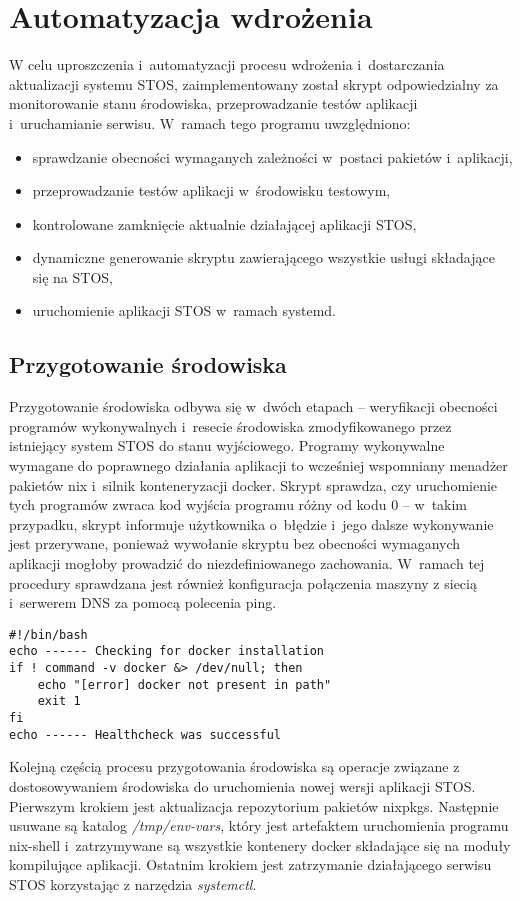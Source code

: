 
\section{Automatyzacja wdrożenia}
W celu uproszczenia i~automatyzacji procesu wdrożenia i~dostarczania aktualizacji systemu STOS, zaimplementowany został skrypt odpowiedzialny za monitorowanie stanu środowiska, przeprowadzanie testów aplikacji i~uruchamianie serwisu. W~ramach tego programu uwzględniono:
\begin{itemize}
	\item sprawdzanie obecności wymaganych zależności w~postaci pakietów i~aplikacji,
	\item przeprowadzanie testów aplikacji w~środowisku testowym,
	\item kontrolowane zamknięcie aktualnie działającej aplikacji STOS,
	\item dynamiczne generowanie skryptu zawierającego wszystkie usługi składające się na STOS,
	\item uruchomienie aplikacji STOS w~ramach systemd.
\end{itemize}
\subsection{Przygotowanie środowiska}
Przygotowanie środowiska odbywa się w~dwóch etapach -- weryfikacji obecności programów wykonywalnych i~resecie środowiska zmodyfikowanego przez istniejący system STOS do stanu wyjściowego. 
\newline \noindent Programy wykonywalne wymagane do poprawnego działania aplikacji to wcześniej wspomniany menadżer pakietów nix i~silnik konteneryzacji docker. Skrypt sprawdza, czy uruchomienie tych programów zwraca kod wyjścia programu różny od kodu 0 -- w~takim przypadku, skrypt informuje użytkownika o~błędzie i~jego dalsze wykonywanie jest przerywane, ponieważ wywołanie skryptu bez obecności wymaganych aplikacji mogłoby prowadzić do niezdefiniowanego zachowania. W~ramach tej procedury sprawdzana jest również konfiguracja połączenia maszyny z siecią i~serwerem DNS za pomocą polecenia ping.
\lstset{style=shell}
\begin{lstlisting}[caption = {Przykład weryfikacji obecności instalacji programu "docker" w~systemie.}]
#!/bin/bash
echo ------ Checking for docker installation 
if ! command -v docker &> /dev/null; then
    echo "[error] docker not present in path"
    exit 1
fi
echo ------ Healthcheck was successful 
\end{lstlisting}
\noindent Kolejną częścią procesu przygotowania środowiska są operacje związane z dostosowywaniem środowiska do uruchomienia nowej wersji aplikacji STOS. Pierwszym krokiem jest aktualizacja repozytorium pakietów nixpkgs. Następnie usuwane są katalog \textit{/tmp/env-vars}, który jest artefaktem uruchomienia programu nix-shell i~zatrzymywane są wszystkie kontenery docker składające się na moduły kompilujące aplikacji. Ostatnim krokiem jest zatrzymanie działającego serwisu STOS korzystając z narzędzia \textit{systemctl}.
